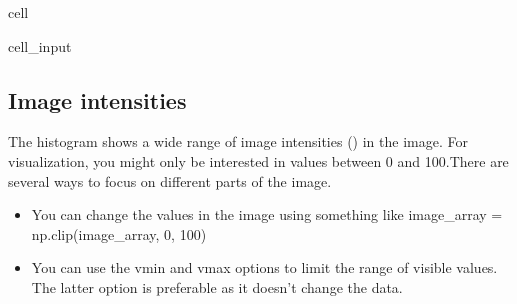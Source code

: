 \documentclass[letterpaper,10pt,english]{jupyterBook}
\begin{document}
\begin{sphinxuseclass}{cell}\begin{sphinxVerbatimInput}

\begin{sphinxuseclass}{cell_input}
\begin{sphinxVerbatim}[commandchars=\\\{\}]
\PYG{p}{[}  \PYG{p}{]} 
\end{sphinxVerbatim}

\end{sphinxuseclass}\end{sphinxVerbatimInput}

\end{sphinxuseclass}

\subsection{Image intensities}
\label{\detokenize{notebooks/Tutorial1_NumpySimpleITK/Tutorial1_NumpySimpleITK_student:image-intensities}}
\sphinxAtStartPar
The histogram shows a wide range of image intensities () in the image. For visualization, you might only be interested in values between 0 and 100.There are several ways to focus on different parts of the image.
\begin{itemize}
\item {} 
\sphinxAtStartPar
You can change the values in the image using something like image\_array = np.clip(image\_array, 0, 100)

\item {} 
\sphinxAtStartPar
You can use the vmin and vmax options to limit the range of visible values.
The latter option is preferable as it doesn’t change the data.

\end{itemize}
\end{document}
